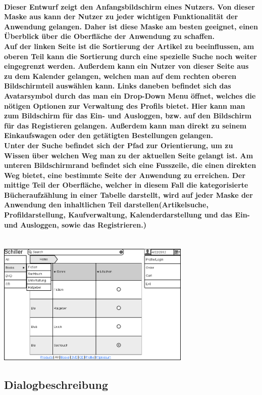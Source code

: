 \documentclass[a4paper]{article}
\begin{document}
\paragraph{Dieser Entwurf zeigt den Anfangsbildschirm eines Nutzers. Von dieser Maske aus kann der Nutzer zu jeder wichtigen Funktionalität der Anwendung gelangen. Daher ist diese Maske am besten geeignet, einen Überblick über die Oberfläche der Anwendung zu schaffen.\\
Auf der linken Seite ist die Sortierung der Artikel zu beeinflussen, am oberen Teil kann die Sortierung durch eine spezielle Suche noch weiter eingegrenzt werden. Außerdem kann ein Nutzer von dieser Seite aus zu dem Kalender gelangen, welchen man auf dem rechten oberen Bildschirmteil auswählen kann. Links daneben befindet sich das Avatarsymbol durch das man ein Drop-Down Menu öffnet, welches die nötigen Optionen zur Verwaltung des Profils bietet. Hier kann man zum Bildschirm für das Ein- und Ausloggen, bzw. auf den Bildschirm für das Registieren gelangen. Außerdem kann man direkt zu seinem Einkaufswagen oder den getätigten Bestellungen gelangen. \\
Unter der Suche befindet sich der Pfad zur Orientierung, um zu Wissen über welchen Weg man zu der aktuellen Seite gelangt ist.
Am unteren Bildschirmrand befindet sich eine Fusszeile, die einen direkten Weg bietet, eine bestimmte Seite der Anwendung zu erreichen.
Der mittige Teil der Oberfläche, welcher in diesem Fall die kategorisierte Bücheraufzählung in einer Tabelle darstellt, wird auf jeder Maske der Anwendung den inhaltlichen Teil darstellen(Artikelsuche, Profildarstellung, Kaufverwaltung, Kalenderdarstellung und das Ein- und Ausloggen, sowie das Registrieren.)\\ \\}
\includegraphics[width=350px]{1Home_Costumer.png}


\subsection{Dialogbeschreibung}
\end{document}
